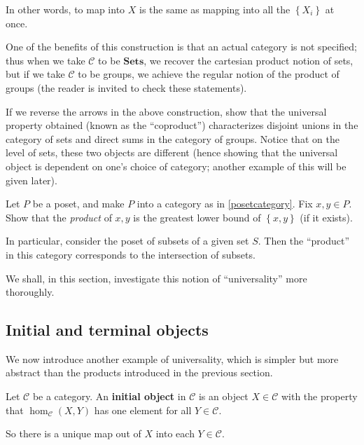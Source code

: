 In other words, to map into $X$ is the same as mapping into all the
$\left\{X_i\right\}$ at once.


\begin{example} One of the benefits of this construction is that an actual
category is not specified; thus when we take $\mathcal{C}$ to be
$\mathbf{Sets}$, we
recover the cartesian product notion of sets, but if we take $\mathcal{C}$ to
be groups, we achieve the regular notion of the product of groups (the reader is
invited to check these statements). \end{example}

\begin{exercise} If we reverse the arrows in the above construction, show that
the universal property obtained (known as the ``coproduct'') characterizes
disjoint unions in the category of sets and direct sums in the category of
groups. Notice that on the level of sets, these two objects are different
(hence showing that the universal object is dependent on one's choice of
category;
another example of this will be given later). \end{exercise}


\begin{exercise} 
Let $P$ be a poset, and make $P$ into a category as in \cref{posetcategory}.
Fix $x, y \in P$. Show that the \emph{product} of $x,y$ is the greatest lower 
bound of $\left\{x,y\right\}$ (if it exists).

In particular, consider the poset of subsets of a given set $S$. Then the
``product'' in this category corresponds to the intersection of subsets.
\end{exercise} 

We shall, in this section, investigate this notion of ``universality''
more thoroughly.


\subsection{Initial and terminal objects}

We now introduce another example of universality, which is simpler but more
abstract than the products introduced in the previous section.

\begin{definition}
Let $\mathcal{C}$ be a category. An \textbf{initial object} in $\mathcal{C}$ is an
object $X \in \mathcal{C}$ with the property that $\hom_{\mathcal{C}}(X, Y)$ has one
element for all $Y \in \mathcal{C}$.

So there is a unique map out of $X$ into each $Y \in \mathcal{C}$.
\end{definition}


